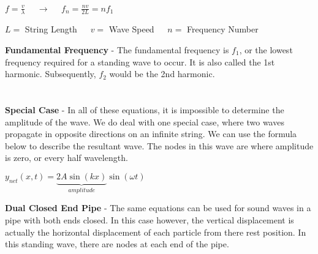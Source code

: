\documentclass{article}
\begin{document}
\begin{center}
	$f=\frac{v}{\lambda} \:\:\:\:\:\:\longrightarrow \:\:\:\:\:\: f_n=\frac{nv}{2L}=nf_1$

	\vspace{\baselineskip}
	$L=$ String Length $\:\:\:\:$ $v=$ Wave Speed $\:\:\:\:$ $n=$
	Frequency Number
\end{center}
\textbf{Fundamental Frequency} - The fundamental frequency is $f_1$, or the lowest frequency required for a standing wave to occur. It is also called the 1st harmonic. Subsequently, $f_2$ would be the 2nd harmonic.\\
\\
\\
\noindent\textbf{Special Case} - In all of these equations, it is impossible to determine the amplitude of the wave. We do deal with one special case, where two waves propagate in opposite directions on an infinite string. We can use the formula below to describe the resultant wave. The nodes in this wave are where amplitude is zero, or every half wavelength. \\
\begin{center}
	$y_{net}\left(x,t\right)=\underbrace{2A\sin\left(kx\right)}_{amplitude}\sin\left(\omega t\right)$
\end{center}
\vspace{\baselineskip}
\textbf{Dual Closed End Pipe} - The same equations can be used for sound waves in a pipe with both ends closed. In this case however, the vertical displacement is actually the horizontal displacement of each particle from there rest position. In this standing wave, there are nodes at each end of the pipe.
\begin{center}

	\hspace*{-8pt}	
\end{center}
\end{document}
